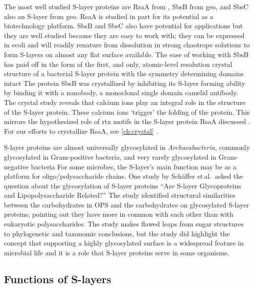 The most well studied \ac{S-layer} proteins are RsaA from \caulobacter{}, SbsB from \acl{geo}, and SbsC also an \ac{S-layer} from \ac{geo}. RsaA is studied in part for its
potential as a biotechnology platform. SbsB and SbsC also have potential for applications but they are well studied because they are easy to work with; they can be expressed in
\acl{ecoli} and will readily renature from dissolution in strong chaotrope solutions to form \acp{S-layer} on almost any flat surface available. The ease of working with SbsB has
paid off in the form of the first, and only, atomic-level resolution crystal structure of a bacterial \ac{S-layer} protein with the symmetry determining domains
intact The protein SbsB was crystallized by inhibiting its \ac{S-layer} forming ability by binding it with a nanobody, a monoclonal single domain
camelid antibody. The crystal study reveals that calcium ions play an integral role in the structure of the \ac{S-layer} protein. These calcium ions `trigger' the folding of the
protein. This mirrors the hypothesized role of \ac{rtx} motifs in the \caulobacter{} \ac{S-layer} protein RsaA discussed . For our efforts to
crystallize RsaA, see \cref{ch:crystal} .
 
\ac{S-layer} proteins are almost universally glycosylated in \textit{Archaeabacteria}, commonly glycosylated in Gram-positive bacteria, and very rarely glycosylated in
Gram-negative bacteria For some microbes, the \ac{S-layer}'s main function may be as a platform for oligo/polysaccharide chains. One
study by Sch\"{a}ffer et\,al.~asked the question about the glycosylation of \ac{S-layer} proteins ``Are \ac{S-layer} Glycoproteins and Lipopolysaccharide
Related?'' The study identified structural similarities between the carbohydrates in \ac{OPS} and the carbohydrates on glycosylated \ac{S-layer} proteins;
pointing out they have more in common with each other than with eukaryotic polysaccharides. The study makes flawed leaps from sugar structures to phylogenetic and taxonomic
conclusions, but the study did highlight the concept that supporting a highly glycosylated surface is a widespread feature in microbial life and it is a role that \ac{S-layer}
proteins serve in some organisms. %

  \subsection{Functions of S-layers}
  \label{sec:intro-slayersfunction}


